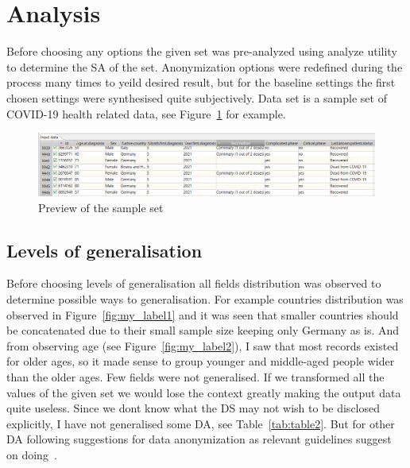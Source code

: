 
\newpage


\section{Analysis}

Before choosing any options the given set was pre-analyzed using analyze utility to determine the \ac{SA} of the set.
Anonymization options were redefined during the process many times to yeild desired result, but for the baseline settings the first chosen
settings were synthesised quite subjectively. Data set is a sample set of COVID-19 health related data, see Figure~\ref{fig:my_label3}
for example.

\begin{figure}[ht]
  \centering
  \includegraphics[width=\textwidth, keepaspectratio]{assets/sample_data}
  \caption{Preview of the sample set}
  \label{fig:my_label3}
\end{figure}

\subsection{Levels of generalisation}

Before choosing levels of generalisation all fields distribution was observed to determine possible ways to generalisation. For example
countries distribution was observed in Figure~\ref{fig:my_label1} and it was seen that smaller countries should be concatenated due to their
small sample size keeping only Germany as is. And from observing age (see Figure~\ref{fig:my_label2}), I saw that most records existed for older ages, so
it
made sense to
group younger and middle-aged people wider than the older ages. Few fields were not generalised. If we transformed all the values of the
given set we would lose the context greatly making the output data quite useless. Since we dont know what the \ac{DS} may not wish to be
disclosed explicitly, I have not generalised some \ac{DA}, see Table~\ref{tab:table2}. But for other \ac{DA} following suggestions for
data anonymization
as relevant guidelines suggest on doing~\cite[]{www.operando.eu}.

